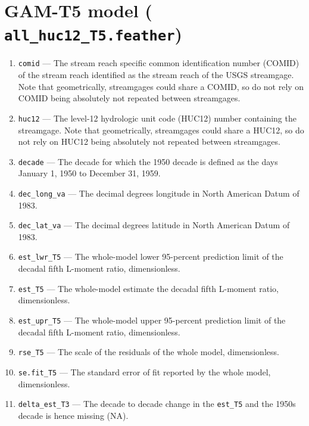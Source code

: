 \documentclass[1p, authoryear, 11pt, times, preprint]{elsarticle}
\newcommand{\code}[1]{{\color{black}%
                       \mbox{\lstinline[basicstyle={\small\ttfamily},
                                        keywordstyle=\scriptsize\ttfamily]|#1|}}}
\begin{document}
\section{GAM-T5 model (\code{all_huc12_T5.feather})}
\begin{enumerate}
\footnotesize
\RaggedRight
\item \code{comid} --- The stream reach specific common identification number (COMID) of the stream reach identified as the stream reach of the USGS streamgage. Note that geometrically, streamgages could share a COMID, so do not rely on COMID being absolutely not repeated between streamgages.
\item \code{huc12} --- The level-12 hydrologic unit code (HUC12) number containing the streamgage. Note that geometrically, streamgages could share a HUC12, so do not rely on HUC12 being absolutely not repeated between streamgages.
\item \code{decade} --- The decade for which the 1950 decade is defined as the days January 1, 1950 to December 31, 1959.
\item \code{dec_long_va} --- The decimal degrees longitude in North American Datum of 1983.
\item \code{dec_lat_va} --- The decimal degrees latitude in North American Datum of 1983.
\item \code{est_lwr_T5} --- The whole-model lower 95-percent prediction limit of the decadal fifth L-moment ratio, dimensionless.
\item \code{est_T5} --- The whole-model estimate the decadal fifth L-moment ratio, dimensionless.
\item \code{est_upr_T5} --- The whole-model upper 95-percent prediction limit of the decadal fifth L-moment ratio, dimensionless.
\item \code{rse_T5} --- The scale of the residuals of the whole model, dimensionless.
\item \code{se.fit_T5} --- The standard error of fit reported by the whole model, dimensionless.
\item \code{delta_est_T3} --- The decade to decade change in the \code{est_T5} and the 1950s decade is hence missing (NA).
\end{enumerate}

 
\end{document}
